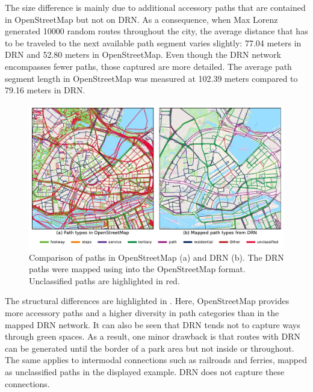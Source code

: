The size difference is mainly due to additional accessory paths that are contained in OpenStreetMap but not on DRN. As a consequence, when Max Lorenz \cite{lorenz_2022} generated 10000 random routes throughout the city, the average distance that has to be traveled to the next available path segment varies slightly: 77.04 meters in DRN and 52.80 meters in OpenStreetMap. Even though the DRN network encompasses fewer paths, those captured are more detailed. The average path segment length in OpenStreetMap was measured at 102.39 meters compared to 79.16 meters in DRN.

\begin{figure}[t]
\centering
\includegraphics[width=\linewidth]{images/routing-drn-osm-map.pdf}
\caption{Comparison of paths in OpenStreetMap (a) and DRN (b). The DRN paths were mapped using  into the OpenStreetMap format. Unclassified paths are highlighted in red.}
\label{fig:routing-drn-osm-map}
\end{figure}

The structural differences are highlighted in . Here, OpenStreetMap provides more accessory paths and a higher diversity in path categories than in the mapped DRN network. It can also be seen that DRN tends not to capture ways through green spaces. As a result, one minor drawback is that routes with DRN can be generated until the border of a park area but not inside or throughout. The same applies to intermodal connections such as railroads and ferries, mapped as unclassified paths in the displayed example. DRN does not capture these connections.


